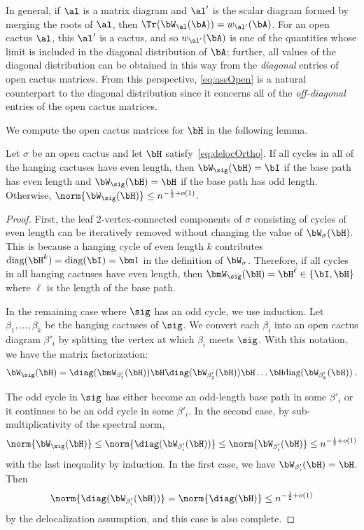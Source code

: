 In general, if $\al$ is a matrix diagram and $\al^{\prime}$ is the scalar diagram formed by merging the roots of $\al$, then $\Tr(\bW_{\al}(\bA)) = w_{\al^{\prime}}(\bA)$.
For an open cactus $\al$, this $\al^{\prime}$ is a cactus, and so $w_{\al^{\prime}}(\bA)$ is one of the quantities whose limit is included in the diagonal distribution of $\bA$; further, all values of the diagonal distribution can be obtained in this way from the \emph{diagonal} entries of open cactus matrices.
From this perspective,
\cref{eq:assOpen} is a natural counterpart to the diagonal distribution since it concerns all of the \emph{off-diagonal} entries of the open cactus matrices.

We compute the open cactus matrices for $\bH$ in the following lemma.

\begin{lemma}\label{lem:diagonal-hadamard}
    Let $\sigma$ be an open cactus and let $\bH$ satisfy~\cref{eq:delocOrtho}.
    If all cycles in all of the hanging cactuses have even length, then $\bW_\sig(\bH) = \bI$ if the base path has even length and $\bW_\sig(\bH) = \bH$ if the base path has odd length. Otherwise, $\norm{\bW_\sig(\bH)} \leq n^{-\frac 12 + o(1)}$.
\end{lemma}

\begin{proof}
    First, the
    leaf 2-vertex-connected components of 
    $\sigma$
    consisting of cycles of even length
    can be iteratively removed without
    changing the value of $\bW_\sigma(\bH)$.
    This is because a hanging cycle of
    even length $k$ contributes $\text{diag}(\bH^{k}) = \text{diag}(\bI) = \bm 1$ in the 
    definition of $\bW_\sigma$.
    Therefore, if all cycles in all hanging cactuses have even length, then $\bmW_\sig(\bH) = \bH^\ell \in \{\bI, \bH\}$ where $\ell$ is the length of the base path.

    In the remaining case where $\sig$ has an odd cycle, we use induction.
    Let $\beta_1, \dots, \beta_k$ be the hanging cactuses of $\sig$.
    We convert each $\beta_i$
    into an open cactus diagram $\beta'_i$ by splitting the vertex at which $\beta_i$ meets $\sig$.
    With this notation, we have the matrix factorization:
    \begin{equation*}\label{eq:hadamard-cactus}
        \bW_{\sig}(\bH) = \diag(\bmW_{\beta'_1}(\bH)) \bH \diag(\bW_{\beta'_2}(\bH)) \bH  \ldots \bH\text{diag}(\bW_{\beta'_{k}}(\bH))\,.
    \end{equation*}

    The odd cycle in $\sig$ has either become an odd-length base path in some $\beta'_i$ or it continues
    to be an odd cycle in some $\beta'_i$.
    In the second case, by sub-multiplicativity of the spectral norm,
    \[
        \norm{\bW_\sig(\bH)} \leq \norm{\diag(\bW_{\beta'_i}(\bH))} \leq \norm{\bW_{\beta'_i}(\bH)} \le n^{-\frac 12 + o(1)}
    \]
    with the last inequality by induction.
    In the first case, we have $\bW_{\beta'_i}(\bH) = \bH$.
    Then 
    \[ \norm{\diag(\bW_{\beta'_i}(\bH))} = \norm{\diag(\bH)} \leq n^{-\frac 12 + o(1)}\] 
    by the delocalization assumption, and this case is also complete.
\end{proof}

